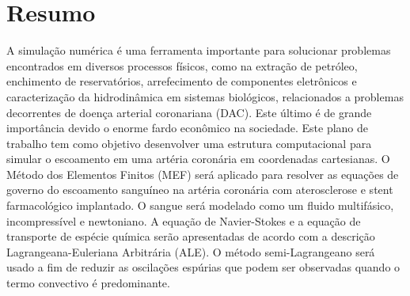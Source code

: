 \section{Resumo}

A simulação numérica é uma ferramenta importante para solucionar problemas encontrados em diversos
processos físicos, como na extração de petróleo, enchimento de reservatórios, arrefecimento de
componentes eletrônicos e caracterização da hidrodinâmica em sistemas biológicos, relacionados a
problemas decorrentes de doença arterial coronariana (DAC). Este último é de grande importância devido
o enorme fardo econômico na sociedade. Este plano de trabalho tem como objetivo desenvolver uma
estrutura computacional para simular o escoamento em uma artéria coronária em coordenadas cartesianas.
O Método dos Elementos Finitos (MEF) será aplicado para resolver as equações de governo do
escoamento sanguíneo na artéria coronária com aterosclerose e stent farmacológico implantado. O sangue
será modelado como um fluido multifásico, incompressível e newtoniano. A equação de Navier-Stokes e a equação de transporte de espécie química serão apresentadas de acordo com a descrição Lagrangeana-Euleriana Arbitrária (ALE). O método semi-Lagrangeano será usado a fim de reduzir as oscilações espúrias que podem ser observadas
quando o termo convectivo é predominante.
